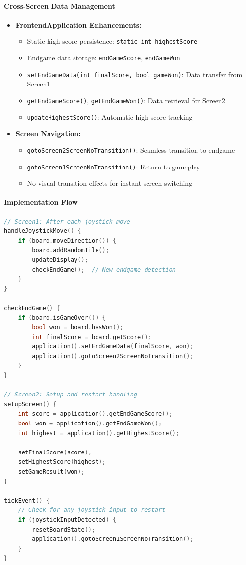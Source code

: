 \documentclass[12pt,a4paper]{article}
\begin{document}
\paragraph{Cross-Screen Data Management}
\begin{itemize}[leftmargin=*]
    \item \textbf{FrontendApplication Enhancements:}
    \begin{itemize}
        \item Static high score persistence: \texttt{static int highestScore}
        \item Endgame data storage: \texttt{endGameScore}, \texttt{endGameWon}
        \item \texttt{setEndGameData(int finalScore, bool gameWon)}: Data transfer from Screen1
        \item \texttt{getEndGameScore()}, \texttt{getEndGameWon()}: Data retrieval for Screen2
        \item \texttt{updateHighestScore()}: Automatic high score tracking
    \end{itemize}
    \item \textbf{Screen Navigation:}
    \begin{itemize}
        \item \texttt{gotoScreen2ScreenNoTransition()}: Seamless transition to endgame
        \item \texttt{gotoScreen1ScreenNoTransition()}: Return to gameplay
        \item No visual transition effects for instant screen switching
    \end{itemize}
\end{itemize}

\paragraph{Implementation Flow}
\begin{lstlisting}[language=C++, caption=Endgame System Flow]
// Screen1: After each joystick move
handleJoystickMove() {
    if (board.moveDirection()) {
        board.addRandomTile();
        updateDisplay();
        checkEndGame();  // New endgame detection
    }
}

checkEndGame() {
    if (board.isGameOver()) {
        bool won = board.hasWon();
        int finalScore = board.getScore();
        application().setEndGameData(finalScore, won);
        application().gotoScreen2ScreenNoTransition();
    }
}

// Screen2: Setup and restart handling
setupScreen() {
    int score = application().getEndGameScore();
    bool won = application().getEndGameWon();
    int highest = application().getHighestScore();
    
    setFinalScore(score);
    setHighestScore(highest);
    setGameResult(won);
}

tickEvent() {
    // Check for any joystick input to restart
    if (joystickInputDetected) {
        resetBoardState();
        application().gotoScreen1ScreenNoTransition();
    }
}
\end{lstlisting}
\end{document}
